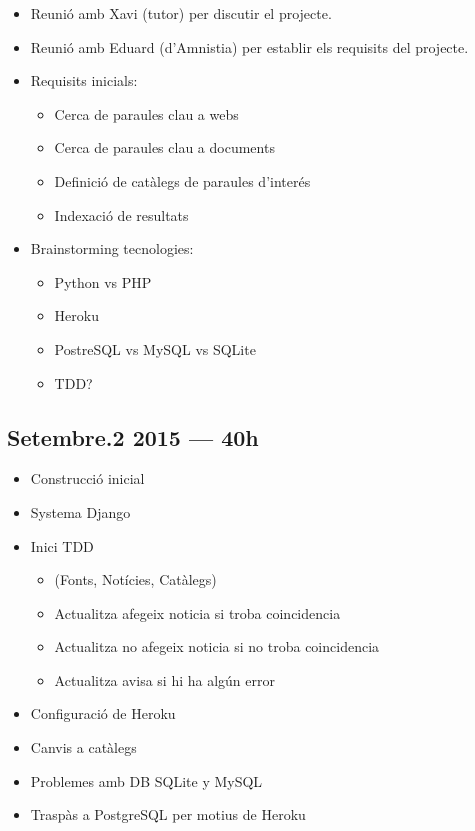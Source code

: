 \documentclass{article}
\begin{document}
\begin{itemize}
    \item Reunió amb Xavi (tutor) per discutir el projecte.
    \item Reunió amb Eduard (d'Amnistia) per establir els requisits del projecte.
    \item Requisits inicials: 
    \begin{itemize}
        \item Cerca de paraules clau a webs
        \item Cerca de paraules clau a documents
        \item Definició de catàlegs de paraules d'interés
        \item Indexació de resultats
    \end{itemize}
    \item Brainstorming tecnologies:
    \begin{itemize}
        \item Python vs PHP
        \item Heroku
        \item PostreSQL vs MySQL vs SQLite
        \item TDD\@?
    \end{itemize}
\end{itemize}

\subsection{Setembre.2 2015 --- 40h}

\begin{itemize}
    \item  Construcció inicial
    \item  Systema Django
    \item  Inici TDD 
	\begin{itemize}
	\item  (Fonts, Notícies, Catàlegs)
	\item  Actualitza afegeix noticia si troba coincidencia
	\item  Actualitza no afegeix noticia si no troba coincidencia
	\item  Actualitza avisa si hi ha algún error
	\end{itemize}
    \item  Configuració de Heroku
    \item  Canvis a catàlegs
    \item  Problemes amb DB SQLite y MySQL
    \item  Traspàs a PostgreSQL per motius de Heroku
\end{itemize}
\end{document}
